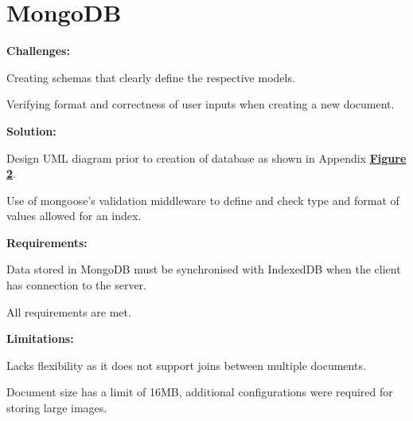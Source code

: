 \documentclass[11pt, a4paper]{article}
\begin{document}
\section{MongoDB}
\textbf{Challenges:}
\begin{enumerate*}[label=\textbf{\arabic*})]
\item Creating schemas that clearly define the respective models.
\item Verifying format and correctness of user inputs when creating a new document.
\end{enumerate*}
%
\textbf{Solution:}
\begin{enumerate*}[label=\textbf{\arabic*})]
\item Design UML diagram prior to creation of database as shown in Appendix
\hyperref[figure:uml]{\textbf{Figure 2}}.
\item Use of mongoose's validation middleware \cite{validation} to define and check type and format
of values allowed for an index.
\end{enumerate*}
%
\textbf{Requirements:}
\begin{enumerate*}[label=\textbf{\arabic*})]
\item Data stored in MongoDB must be synchronised with IndexedDB when the client has connection to
the server.
\item All requirements are met.
\end{enumerate*}
%
\textbf{Limitations:}
\begin{enumerate*}[label=\textbf{\arabic*})]
\item Lacks flexibility as it does not support joins between multiple documents.
\item Document size has a limit of 16MB, additional configurations were required for storing large
images.
\end{enumerate*}
\end{document}
